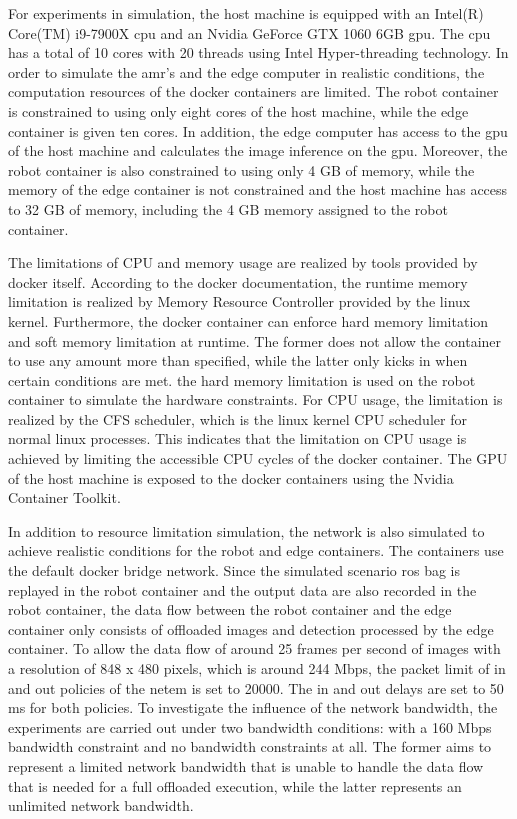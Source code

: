 For experiments in simulation, the host machine is equipped with an Intel(R) Core(TM) i9-7900X \gls{cpu} and an Nvidia GeForce GTX 1060 6GB \gls{gpu}. The \gls{cpu} has a total of 10 cores with 20 threads using Intel Hyper-threading technology. In order to simulate the \gls{amr}'s and the edge computer in realistic conditions, the computation resources of the \gls{docker} containers are limited. The robot container is constrained to using only eight cores of the host machine, while the edge container is given ten cores. In addition, the edge computer has access to the \gls{gpu} of the host machine and calculates the image inference on the \gls{gpu}. Moreover, the robot container is also constrained to using only 4 GB of memory, while the memory of the edge container is not constrained and the host machine has access to 32 GB of memory, including the 4 GB memory assigned to the robot container.

The limitations of CPU and memory usage are realized by tools provided by \gls{docker} itself. According to the \gls{docker} documentation, the runtime memory limitation is realized by Memory Resource Controller provided by the \gls{linux} kernel. Furthermore, the \gls{docker} container can enforce hard memory limitation and soft memory limitation at runtime. The former does not allow the container to use any amount more than specified, while the latter only kicks in when certain conditions are met. the hard memory limitation is used on the robot container to simulate the hardware constraints. For CPU usage, the limitation is realized by the CFS scheduler, which is the \gls{linux} kernel CPU scheduler for normal \gls{linux} processes. This indicates that the limitation on CPU usage is achieved by limiting the accessible CPU cycles of the \gls{docker} container. The GPU of the host machine is exposed to the \gls{docker} containers using the Nvidia Container Toolkit.

In addition to resource limitation simulation, the network is also simulated to achieve realistic conditions for the robot and edge containers. The containers use the default \gls{docker} bridge network. Since the simulated scenario \gls{ros} bag is replayed in the robot container and the output data are also recorded in the robot container, the data flow between the robot container and the edge container only consists of offloaded images and detection processed by the edge container. To allow the data flow of around 25 frames per second of images with a resolution of 848 x 480 pixels, which is around 244 Mbps, the packet limit of in and out policies of the \gls{netem} is set to 20000. The in and out delays are set to 50 ms for both policies. To investigate the influence of the network bandwidth, the experiments are carried out under two bandwidth conditions: with a 160 Mbps bandwidth constraint and no bandwidth constraints at all. The former aims to represent a limited network bandwidth that is unable to handle the data flow that is needed for a full offloaded execution, while the latter represents an unlimited network bandwidth. 


